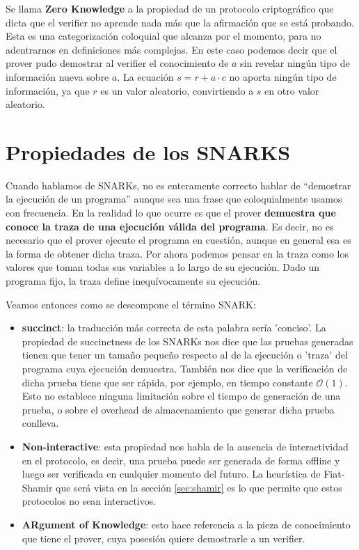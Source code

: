 Se llama \textbf{Zero Knowledge}\cite{goldwasser1985knowledge} a la propiedad de un protocolo criptográfico que dicta que el verifier no aprende nada más que la afirmación que se está probando. Esta es una categorización coloquial que alcanza por el momento, para no adentrarnos en definiciones más complejas. En este caso podemos decir que el prover pudo demostrar al verifier el conocimiento de $a$ sin revelar ningún tipo de información nueva sobre $a$. La ecuación $s = r + a\cdot c$ no aporta ningún tipo de información, ya que $r$ es un valor aleatorio, convirtiendo a $s$ en otro valor aleatorio.

\section{Propiedades de los SNARKS} \label{sec:snarks}
Cuando hablamos de SNARKs, no es enteramente correcto hablar de “demostrar la ejecución de un programa'' aunque sea una frase que coloquialmente usamos con frecuencia. En la realidad lo que ocurre es que el prover \textbf{demuestra que conoce la traza de una ejecución válida del programa}. Es decir, no es necesario que el prover ejecute el programa en cuestión, aunque en general esa es la forma de obtener dicha traza. Por ahora podemos pensar en la traza como los valores que toman todas sus variables a lo largo de su ejecución. Dado un programa fijo, la traza define inequívocamente su ejecución.

Veamos entonces como se descompone el término SNARK:
\begin{itemize}
    \item \textbf{succinct}: la traducción más correcta de esta palabra sería 'conciso'. La propiedad de succinctness de los SNARKs nos dice que las pruebas generadas tienen que tener un tamaño pequeño respecto al de la ejecución o 'traza' del programa cuya ejecución demuestra. También nos dice que la verificación de dicha prueba tiene que ser rápida, por ejemplo, en tiempo constante $\mathcal{O}(1)$. Esto no establece ninguna limitación sobre el tiempo de generación de una prueba, o sobre el overhead de almacenamiento que generar dicha prueba conlleva.
    
    \item \textbf{Non-interactive}: esta propiedad nos habla de la ausencia de interactividad en el protocolo, es decir, una prueba puede ser generada de forma offline y luego ser verificada en cualquier momento del futuro. La heurística de Fiat-Shamir que será vista en la sección \ref{sec:shamir} es lo que permite que estos protocolos no sean interactivos.

    \item \textbf{ARgument of Knowledge}: esto hace referencia a la pieza de conocimiento que tiene el prover, cuya posesión quiere demostrarle a un verifier.
\end{itemize}

